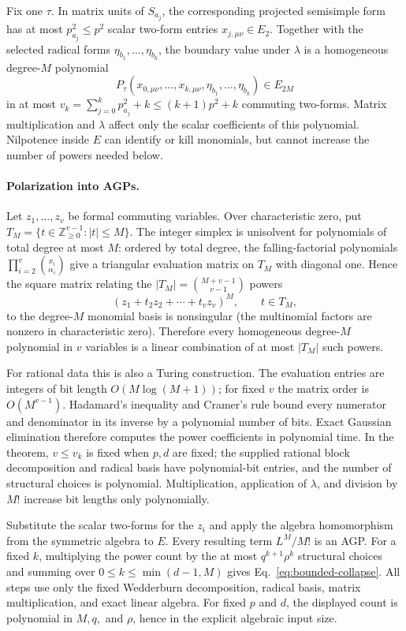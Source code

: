 \documentclass[aps,pra,reprint,superscriptaddress,nofootinbib,longbibliography,showkeys]{revtex4-2}
\theoremstyle{definition}
\begin{document}
Fix one $\tau$.  In matrix units of $S_{a_j}$, the corresponding projected
semisimple form has at most $p_{a_j}^2\le p^2$ scalar two-form entries
$x_{j,\mu\nu}\in E_2$.  Together with the selected radical forms
$\eta_{b_1},\ldots,\eta_{b_k}$, the boundary value under $\lambda$ is a
homogeneous degree-$M$ polynomial
\[
 P_\tau(x_{0,\mu\nu},\ldots,x_{k,\mu\nu},
        \eta_{b_1},\ldots,\eta_{b_k})\in E_{2M}
\]
in at most
$v_k=\sum_{j=0}^{k}p_{a_j}^2+k\le(k+1)p^2+k$ commuting two-forms.  Matrix
multiplication and $\lambda$ affect only the scalar coefficients of this
polynomial.  Nilpotence inside $E$ can identify or kill monomials, but cannot
increase the number of powers needed below.

\paragraph{Polarization into AGPs.}
Let $z_1,\ldots,z_v$ be formal commuting variables.  Over characteristic zero,
put $T_M=\{t\in\mathbb Z_{\ge0}^{v-1}:|t|\le M\}$.  The integer simplex is
unisolvent for polynomials of total degree at most $M$: ordered by total degree,
the falling-factorial polynomials
$\prod_{i=2}^v\binom{x_i}{\alpha_i}$ give a triangular evaluation matrix on
$T_M$ with diagonal one.  Hence the square matrix relating the
$|T_M|=\binom{M+v-1}{v-1}$ powers
\[
 (z_1+t_2z_2+\cdots+t_vz_v)^M,\qquad t\in T_M,
\]
to the degree-$M$ monomial basis is nonsingular (the multinomial factors are
nonzero in characteristic zero).  Therefore every homogeneous degree-$M$
polynomial in $v$ variables is a linear combination of at most $|T_M|$ such
powers.

For rational data this is also a Turing construction.  The evaluation entries
are integers of bit length $O(M\log(M+1))$; for fixed $v$ the matrix order is
$O(M^{v-1})$.  Hadamard's inequality and Cramer's rule bound every numerator
and denominator in its inverse by a polynomial number of bits.  Exact Gaussian
elimination therefore computes the power coefficients in polynomial time.  In
the theorem, $v\le v_k$ is fixed when $p,d$ are fixed; the supplied rational
block decomposition and radical basis have polynomial-bit entries, and the
number of structural choices is polynomial.  Multiplication, application of
$\lambda$, and division by $M!$ increase bit lengths only polynomially.

Substitute the scalar two-forms for the $z_i$ and apply the algebra homomorphism
from the symmetric algebra to $E$.  Every resulting term $L^M/M!$ is an AGP.
For a fixed $k$, multiplying the power count by the at most
$q^{k+1}\rho^k$ structural choices and summing over
$0\le k\le\min(d-1,M)$ gives Eq.~\eqref{eq:bounded-collapse}.  All steps use
only the fixed Wedderburn decomposition, radical basis, matrix multiplication,
and exact linear algebra.  For fixed $p$ and $d$, the displayed count is
polynomial in $M,q,$ and $\rho$, hence in the explicit algebraic input size.
\end{document}
